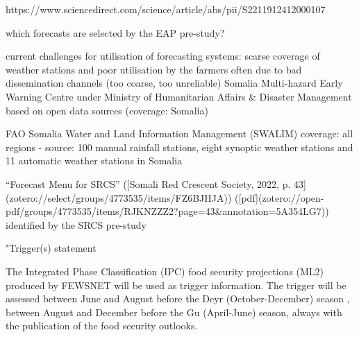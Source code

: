 {{%
https://www.sciencedirect.com/science/article/abs/pii/S2211912412000107


which forecasts are selected by the EAP pre-study?

current challenges for utilisation of forecasting systems: scarse coverage of weather stations and poor utilisation by the farmers often due to bad dissemination channels  (too coarse, too unreliable)
Somalia Multi-hazard Early Warning Centre under Ministry of Humanitarian Affairs & Disaster Management
based on open data sources (coverage: Somalia)

FAO Somalia Water and Land Information Management (SWALIM) coverage: all regions - source: 100 manual rainfall stations, eight synoptic weather stations and 11 automatic weather stations in Somalia

“Forecast Menu for SRCS” ([Somali Red Crescent Society, 2022, p. 43](zotero://select/groups/4773535/items/FZ6BJHJA)) ([pdf](zotero://open-pdf/groups/4773535/items/RJKNZZZ2?page=43&annotation=5A354LG7))
identified by the SRCS pre-study


"Trigger(s) statement

The  Integrated Phase Classification (IPC) food security projections (ML2) produced by FEWSNET will be used as trigger information. 
The trigger will be assessed between June and August before the Deyr (October-December) season , between August and December before the Gu (April-June) season, always with the  publication of the food security outlooks.


}}
